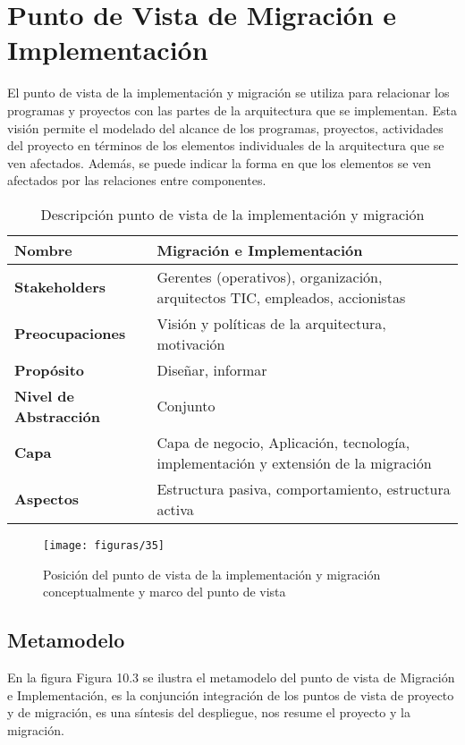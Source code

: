 \section{Punto de Vista de Migración e Implementación}
El punto de vista de la implementación y migración se utiliza para relacionar los programas y proyectos con las partes de la arquitectura que se implementan. Esta visión permite el modelado del alcance de los programas, proyectos, actividades del proyecto en términos de los elementos individuales de la arquitectura que se ven afectados. Además, se puede indicar la forma en que los elementos se ven afectados por las relaciones entre componentes.

  \begin{table}[H]
	\centering
	\begin{tabular}{lp{8cm}}
		\toprule
		\textbf{Nombre} & \textbf{Migración e Implementación} \\
		\midrule
		\textbf{Stakeholders} & Gerentes (operativos), organización, arquitectos TIC, empleados, accionistas \\
		\textbf{Preocupaciones} &  Visión y políticas de la arquitectura, motivación \\
		\textbf{Propósito} & Diseñar, informar \\
		\textbf{Nivel de Abstracción} & Conjunto \\
		\textbf{Capa} & Capa de negocio, Aplicación, tecnología, implementación y extensión de la migración \\
		\textbf{Aspectos} & Estructura pasiva, comportamiento, estructura activa \\
		\bottomrule
	\end{tabular}
	\captionsetup{width=.95\textwidth}
	\caption{Descripción punto de vista de la implementación y migración}
	\label{tabla28}
  \end{table}

  \begin{figure}[H]
	\centering
	\texttt{[image: figuras/35]}
	\captionsetup{width=.95\textwidth}
	\caption{Posición del punto de vista de la implementación y migración conceptualmente y marco del punto de vista}
	\label{figura37}
  \end{figure}

  \subsection{Metamodelo}
  En la figura Figura 10.3 se ilustra el metamodelo del punto de vista de Migración e Implementación, es la conjunción integración de los puntos de vista de proyecto y de migración, es una síntesis del despliegue, nos resume el proyecto y la migración.

